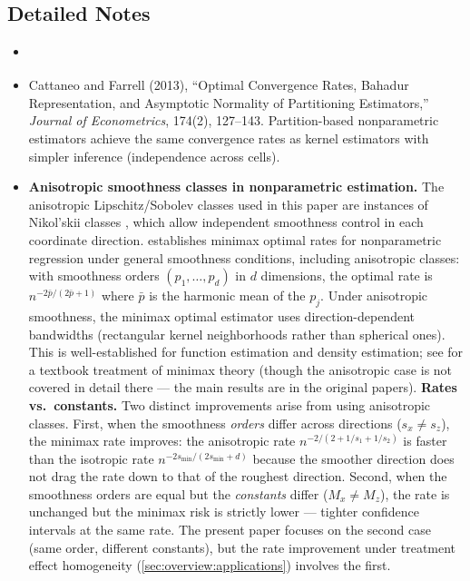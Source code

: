 \subsection{Detailed Notes}\label{sec:lit:detailed}

\begin{itemize}
	\item \textcite{armstrong_simple_2020}
	\item Cattaneo and Farrell (2013), ``Optimal Convergence Rates, Bahadur Representation, and Asymptotic Normality of Partitioning Estimators,'' \emph{Journal of Econometrics}, 174(2), 127--143.
	Partition-based nonparametric estimators achieve the same convergence rates as kernel estimators with simpler inference (independence across cells).
	\item \textbf{Anisotropic smoothness classes in nonparametric estimation.}
	The anisotropic Lipschitz/Sobolev classes used in this paper are instances of Nikol'skii classes \parencite{nikolskii_approximation_1975}, which allow independent smoothness control in each coordinate direction.
	\textcite{stone_optimal_1980} establishes minimax optimal rates for nonparametric regression under general smoothness conditions, including anisotropic classes: with smoothness orders $(p_1, \ldots, p_d)$ in $d$ dimensions, the optimal rate is $n^{-2\bar{p}/(2\bar{p}+1)}$ where $\bar{p}$ is the harmonic mean of the $p_j$.
	Under anisotropic smoothness, the minimax optimal estimator uses direction-dependent bandwidths (rectangular kernel neighborhoods rather than spherical ones).
	This is well-established for function estimation and density estimation; see \textcite{tsybakov_introduction_2009} for a textbook treatment of minimax theory (though the anisotropic case is not covered in detail there --- the main results are in the original papers).
	\textbf{Rates vs.\ constants.}
	Two distinct improvements arise from using anisotropic classes.
	First, when the smoothness \emph{orders} differ across directions ($s_x \neq s_z$), the minimax rate improves: the anisotropic rate $n^{-2/(2 + 1/s_1 + 1/s_2)}$ is faster than the isotropic rate $n^{-2s_{\min}/(2s_{\min}+d)}$ because the smoother direction does not drag the rate down to that of the roughest direction.
	Second, when the smoothness orders are equal but the \emph{constants} differ ($M_x \neq M_z$), the rate is unchanged but the minimax risk is strictly lower --- tighter confidence intervals at the same rate.
	The present paper focuses on the second case (same order, different constants), but the rate improvement under treatment effect homogeneity (\cref{sec:overview:applications}) involves the first.

\end{itemize}
